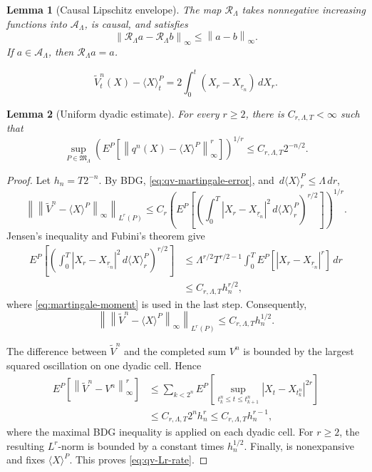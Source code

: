 \documentclass[10pt,a4paper]{amsart}
\newtheorem{lemma}{Lemma}
\newcommand{\abs}[1]{\left\lvert #1\right\rvert}
\newcommand{\cA}{\mathcal A}
\newcommand{\dd}{\,d}
\newcommand{\norm}[1]{\left\lVert #1\right\rVert}
\begin{document}
\begin{lemma}[Causal Lipschitz envelope]\label{lem:lipschitz-envelope}
The map \(\mathcal R_\Lambda\) takes nonnegative increasing functions into
\(\cA_\Lambda\), is causal, and satisfies
\[
  \norm{\mathcal R_\Lambda a-\mathcal R_\Lambda b}_\infty
  \le\norm{a-b}_\infty.
\]
If \(a\in\cA_\Lambda\), then \(\mathcal R_\Lambda a=a\).
\end{lemma}

\begin{equation}\label{eq:qv-martingale-error}
  \widetilde V_t^n(X)-\langle X\rangle_t^P
  =
  2\int_0^t(X_r-X_{\underline r_n})\dd X_r.
\end{equation}

\begin{lemma}[Uniform dyadic estimate]\label{lem:dyadic-estimate}
For every \(r\ge2\), there is \(C_{r,\Lambda,T}<\infty\) such that
\begin{equation}\label{eq:qv-Lr-rate}
  \sup_{P\in\mathfrak M_\Lambda}
  \left(
    E^P\left[
      \norm{q^n(X)-\langle X\rangle^P}_\infty^r
    \right]
  \right)^{1/r}
  \le C_{r,\Lambda,T}2^{-n/2}.
\end{equation}
\end{lemma}

\begin{proof}
Let \(h_n=T2^{-n}\).  By BDG, \eqref{eq:qv-martingale-error}, and
\(\dd\langle X\rangle_r^P\le\Lambda\dd r\),
\[
  \left\|
    \norm{\widetilde V^n-\langle X\rangle^P}_\infty
  \right\|_{L^r(P)}
  \le
  C_r
  \left(
    E^P\left[
      \left(
        \int_0^T
        \abs{X_r-X_{\underline r_n}}^2
        \dd\langle X\rangle_r^P
      \right)^{r/2}
    \right]
  \right)^{1/r}.
\]
Jensen's inequality and Fubini's theorem give
\begin{align*}
E^P\left[
  \left(\int_0^T
    \abs{X_r-X_{\underline r_n}}^2\dd\langle X\rangle_r^P
  \right)^{r/2}
\right]
&\le
\Lambda^{r/2}T^{r/2-1}
\int_0^T E^P\!\left[
  \abs{X_r-X_{\underline r_n}}^r
\right]\dd r\\
&\le C_{r,\Lambda,T}h_n^{r/2},
\end{align*}
where \eqref{eq:martingale-moment} is used in the last step.
Consequently,
\[
  \left\|
    \norm{\widetilde V^n-\langle X\rangle^P}_\infty
  \right\|_{L^r(P)}
  \le C_{r,\Lambda,T}h_n^{1/2}.
\]

The difference between \(\widetilde V^n\) and the completed sum \(V^n\) is
bounded by the largest squared oscillation on one dyadic cell.  Hence
\begin{align*}
  E^P\left[
    \norm{\widetilde V^n-V^n}_\infty^r
  \right]
  &\le
  \sum_{k<2^n}
  E^P\left[
    \sup_{t_k^n\le t\le t_{k+1}^n}
    \abs{X_t-X_{t_k^n}}^{2r}
  \right]\\
  &\le C_{r,\Lambda,T}2^nh_n^r
   \le C_{r,\Lambda,T}h_n^{r-1},
\end{align*}
where the maximal BDG inequality is applied on each dyadic cell.  For
\(r\ge2\), the resulting \(L^r\)-norm is bounded by a constant times
\(h_n^{1/2}\).  Finally,  is nonexpansive and
fixes \(\langle X\rangle^P\).
This proves \eqref{eq:qv-Lr-rate}.
\end{proof}
\end{document}
